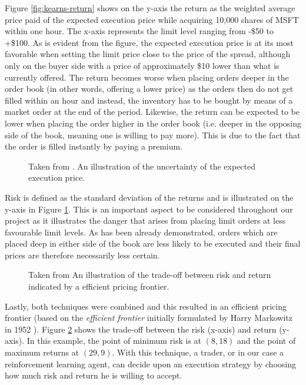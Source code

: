 Figure \ref{fig:kearns-return} shows on the y-axis the return as the weighted average price paid of the expected execution price while acquiring 10,000 shares of MSFT within one hour.
The x-axis represents the limit level ranging from -\$50 to +\$100.
As is evident from the figure, the expected execution price is at its most favorable when setting the limit price close to the price of the spread, although only on the buyer side with a price of approximately \$10 lower than what is currently offered.
The return becomes worse when placing orders deeper in the order book (in other words, offering a lower price) as the orders then do not get filled within an hour and instead, the inventory has to be bought by means of a market order at the end of the period.
Likewise, the return can be expected to be lower when placing the order higher in the order book (i.e. deeper in the opposing side of the book, meaning one is willing to pay more).
This is due to the fact that the order is filled instantly by paying a premium.

\begin{figure}[H]
    \centering
    \caption{Taken from \cite{nevmyvaka2005electronic}. An illustration of the uncertainty of the expected execution price.}
    \label{fig:kearns-std}
\end{figure}

Risk is defined as the standard deviation of the returns and is illustrated on the y-axis in Figure \ref{fig:kearns-std}.
This is an important aspect to be considered throughout our project as it illustrates the danger that arises from placing limit orders at less favourable limit levels.
As has been already demonstrated, orders which are placed deep in either side of the book are less likely to be executed and their final prices are therefore necessarily less certain.

\begin{figure}[H]
    \centering
    \caption{Taken from \cite{nevmyvaka2005electronic} An illustration of the trade-off between risk and return indicated by a efficient pricing frontier.}
    \label{fig:kearns-frontier}
\end{figure}

Lastly, both techniques were combined and this resulted in an efficient pricing frontier (based on the \textit{efficient frontier} initially formulated by Harry Markowitz in 1952 \cite{markowitz1952portfolio}). 
Figure \ref{fig:kearns-frontier} shows the trade-off between the risk (x-axis) and return (y-axis).
In this example, the point of minimum risk is at $(8, 18)$ and the point of maximum returns at $(29, 9)$.
With this technique, a trader, or in our case a reinforcement learning agent, can decide upon an execution strategy by choosing how much risk and return he is willing to accept.

